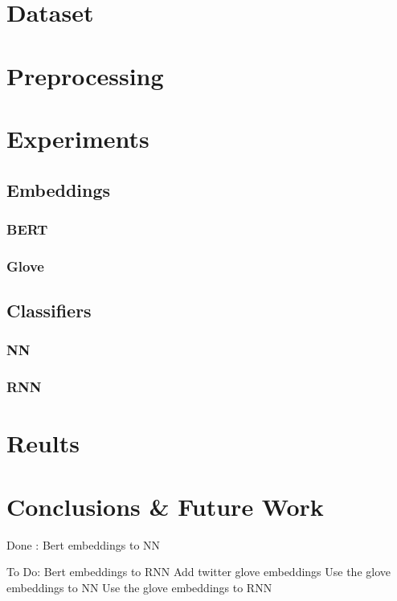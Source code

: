 \documentclass{article}
\begin{document}
\section{Dataset}
\section{Preprocessing}

\section{Experiments}
  \subsection{Embeddings}
    \subsubsection{BERT}
    \subsubsection{Glove}
  \subsection{Classifiers}
    \subsubsection{NN}
    \subsubsection{RNN}

\section{Reults}

\section{Conclusions \& Future Work}
Done : Bert embeddings to NN

To Do:
Bert embeddings to RNN
Add twitter glove embeddings
Use the glove embeddings to NN
Use the glove embeddings to RNN
% 
% 

\end{document}
